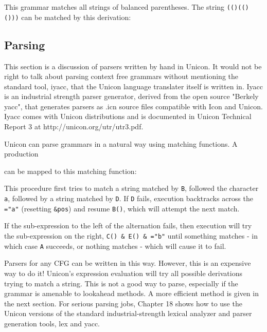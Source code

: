 This grammar matches all strings of balanced parentheses. The string
\texttt{(()(()()))} can be matched by this derivation:


\subsection*{Parsing}

This section is a discussion of parsers written by hand in Unicon.
It would not be right to talk about parsing context free grammars
without mentioning the standard tool, iyacc, that the Unicon language
translater itself is written in.  Iyacc is an industrial strength
parser generator, derived from the open source "Berkely yacc", that
generates parsers as .icn source files compatible with Icon and Unicon.
Iyacc comes with Unicon distributions and is documented in Unicon Technical
Report 3 at http://unicon.org/utr/utr3.pdf. 

Unicon can parse grammars in a natural way using matching
functions. A production


\noindent
can be mapped to this matching function:


\noindent
This procedure first tries to match a string matched by \texttt{B},
followed the character \texttt{a}, followed by a string matched by
\texttt{D}. If \texttt{D} fails, execution
backtracks across the \texttt{="a"}
(resetting \texttt{\&pos}) and resume \texttt{B()}, which will attempt
the next match.

If the sub-expression to the left of the alternation fails, then execution will try the
sub-expression on the right, \texttt{C() \& E() \&
="b"} until something matches - in which
case \texttt{A} succeeds, or nothing matches - which will cause it to
fail.

Parsers for any CFG can be written in this way. However, this is an
expensive way to do it! Unicon's
expression evaluation will try all possible derivations
trying to match a string. This is not a good way to parse, especially
if the grammar is amenable to lookahead methods. A more efficient
method is given in the next section. For serious parsing jobs, Chapter
18 shows how to use the Unicon versions of the standard
industrial-strength lexical analyzer and parser generation tools, lex
and yacc.

